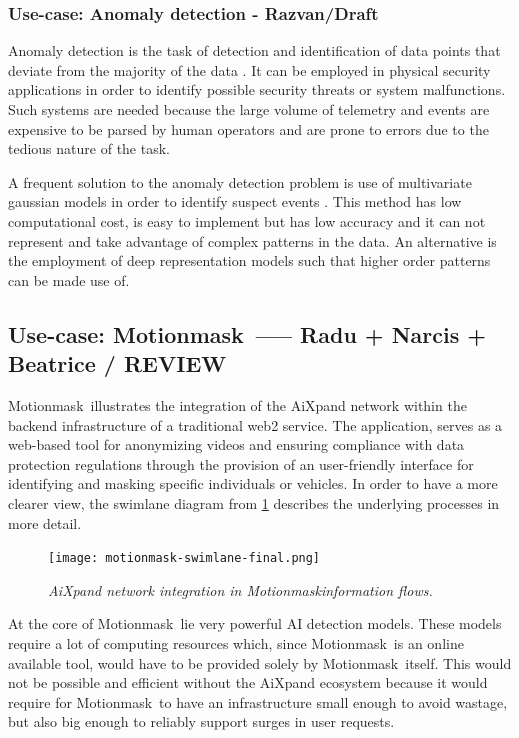 \documentclass{article}
\begin{document}
\subsubsection{Use-case: Anomaly detection - Razvan/Draft}
Anomaly detection is the task of detection and identification of data points that deviate from the majority of the data \cite{chandola2009anomaly}. It can be employed in physical security applications in order to identify possible security threats or system malfunctions. Such systems are needed because the large volume of telemetry and events are expensive to be parsed by human operators and are prone to errors due to the tedious nature of the task. 

A frequent solution to the anomaly detection problem is use of multivariate gaussian models in order to identify suspect events \cite{mehrotra2017anomaly}. This method has low computational cost, is easy to implement but has low accuracy and it can not represent and take advantage of complex patterns in the data. An alternative is the employment of deep representation models \cite{chalapathy2019deep} such that higher order patterns can be made use of. 


\subsection{Use-case: Motionmask\texttrademark\ ----- Radu + Narcis + Beatrice / REVIEW}

Motionmask\texttrademark\ illustrates the integration of the AiXpand network within the backend infrastructure of a traditional web2 service. The application, serves as a web-based tool for anonymizing videos and ensuring compliance with data protection regulations through the provision of an user-friendly interface for identifying and masking specific individuals or vehicles. In order to have a more clearer view, the swimlane diagram from \figurename{\ref{fig:mm_swimlane}} describes the underlying processes in more detail.

\begin{figure}[htp]
    \centering
    \texttt{[image: motionmask-swimlane-final.png]}
    \caption{\textit{AiXpand network integration in Motionmask\texttrademark information flows.}}
    \label{fig:mm_swimlane}
\end{figure}

At the core of Motionmask\texttrademark\ lie very powerful AI detection models. These models require a lot of computing resources which, since Motionmask\texttrademark\ is an online available tool, would have to be provided solely by Motionmask\texttrademark\ itself. This would not be possible and efficient without the AiXpand ecosystem because it would require for Motionmask\texttrademark\ to have an infrastructure small enough to avoid wastage, but also big enough to reliably support surges in user requests. 
\end{document}
